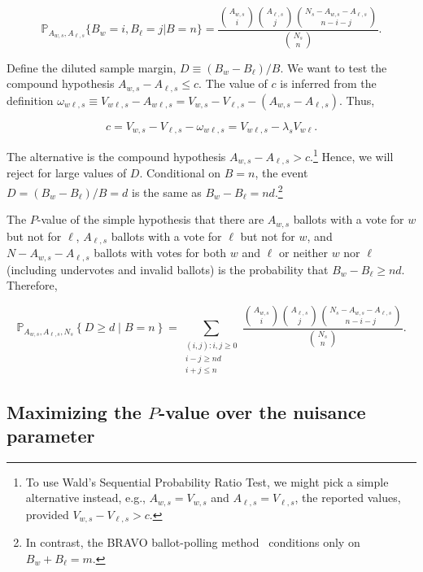 \documentclass[runningheads]{llncs}
\newcommand{\beq}{\begin{equation}}
\newcommand{\eeq}{\end{equation}}
\begin{document}
\begin{equation}
    \mathbb{P}_{A_{w,s}, A_{\ell,s}} \{ B_w = i, B_\ell = j \vert B=n \} = 
     \frac{ {A_{w,s } \choose i}{A_{\ell,s} \choose j}{N_s - A_{w,s} - A_{\ell,s} \choose n-i-j}}{{N_s \choose n}}.
\end{equation}

Define the diluted sample margin, $D \equiv (B_w - B_\ell)/B$.
We want to test the compound hypothesis $A_{w,s} - A_{\ell,s} \le c$.
The value of $c$ is inferred from the definition
$\omega_{w\ell,s} \equiv V_{w\ell,s} - A_{w\ell,s} = V_{w,s} - V_{\ell,s} - (A_{w,s} -A_{\ell,s})$.
Thus,

\beq
    c = V_{w,s} - V_{\ell,s} - \omega_{w\ell,s} = V_{w\ell,s} - \lambda_s V_{w\ell}.
\eeq

The alternative is the compound hypothesis 
$A_{w,s} - A_{\ell,s} > c$.\footnote{%
    To use Wald's Sequential Probability Ratio Test, we might pick a simple alternative instead, e.g.,
   $A_{w,s} = V_{w,s}$ and $A_{\ell,s} = V_{\ell,s}$, the reported values, provided 
   $V_{w,s} - V_{\ell,s} > c$.
}
Hence, we will reject for large values of $D$.
Conditional on $B=n$, the event $D = (B_w - B_\ell)/B = d$ is the same as $B_w - B_\ell = nd$.\footnote{%
In contrast, the BRAVO ballot-polling
method~\cite{lindemanEtal12}
conditions only on $B_w+B_\ell = m$.
}


The $P$-value of the simple hypothesis that there are $A_{w,s}$ ballots with
a vote for $w$ but not for $\ell$, $A_{\ell,s}$ ballots with a vote for $\ell$ but not for $w$, 
and $N - A_{w,s} - A_{\ell,s}$ ballots with votes for both $w$ and $\ell$ or neither $w$ nor $\ell$ 
(including undervotes and
invalid ballots) is the probability that $B_w - B_\ell \geq nd$.
Therefore,

\begin{equation}
   \mathbb{P}_{A_{w,s}, A_{\ell,s}, N_s} \left \{ D \geq d \;\vert\; B = n\right \} = 
   \sum_{\substack{(i, j) :  i, j\ge 0 \\ i-j \geq nd \\ i+j \leq n}} \frac{ {A_{w,s } \choose i}{A_{\ell,s} \choose j}{N_s - A_{w,s} - A_{\ell,s} \choose n-i-j}}{{N_s \choose n}}.
\end{equation}



\subsection{Maximizing the $P$-value over the nuisance parameter}
\end{document}
